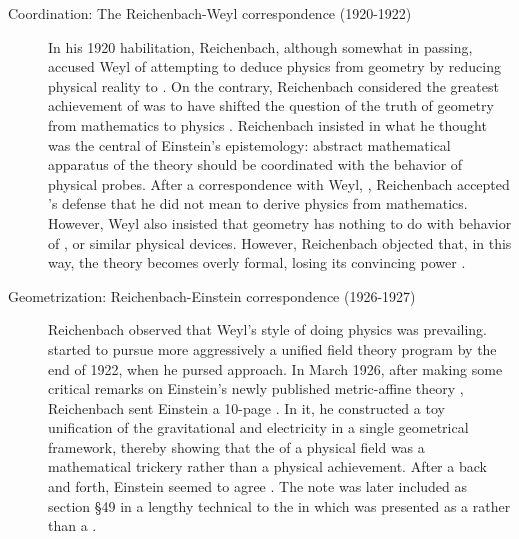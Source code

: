 \documentclass[draft]{article}
\newcommand{\PRZL}{\citetitle{Reichenbach1928}\xspace}
\begin{document}
\begin{description}
\item[Coordination: The Reichenbach-Weyl correspondence (1920-1922)]\label{reichenbachweyl} In his 1920 habilitation, Reichenbach, although somewhat in passing, accused Weyl of attempting to deduce physics from geometry by reducing physical reality to  \citep[73]{Reichenbach1920a}. On the contrary, Reichenbach considered the greatest achievement of \gr was to have shifted the question of the truth of geometry from mathematics to physics \citep[73]{Reichenbach1920a}. Reichenbach insisted in what he thought was the central of Einstein's epistemology: abstract mathematical apparatus of the theory should be coordinated with the behavior of physical probes. After a  correspondence with Weyl, \citet[367--368]{Reichenbach1921}, Reichenbach accepted 's defense that he did not mean to derive physics from mathematics. However, Weyl also insisted that \spti geometry has nothing to do with behavior of \rac, or similar physical devices. However, Reichenbach objected that, in this way, the theory becomes overly formal, losing its convincing power \citep[367]{Reichenbach1921}.

\item[Geometrization: Reichenbach-Einstein correspondence (1926-1927)]\label{reichenbacheinsteinI} Reichenbach observed that Weyl's style of doing physics was prevailing.  started to pursue more aggressively a unified field theory program by the end of 1922, when he pursed  approach. In March 1926, after making some critical remarks on Einstein's newly published metric-affine theory \citep{Einstein1925a}, Reichenbach sent Einstein a 10-page  \citep{Reichenbach1926f}. In it, he constructed a toy unification of the gravitational and electricity in a single geometrical framework, thereby showing that the  of a physical field was a mathematical trickery rather than a physical achievement. After a back and forth, Einstein seemed to agree \citep{Lehmkuhl2014}. The note was later included as section \S49 in a lengthy technical \Ap to the \PRZL \citep[-50]{Reichenbach1928} in which \gr was presented as a  rather than a  \citep{Giovanelli2020}. 


\end{description}
\end{document}
